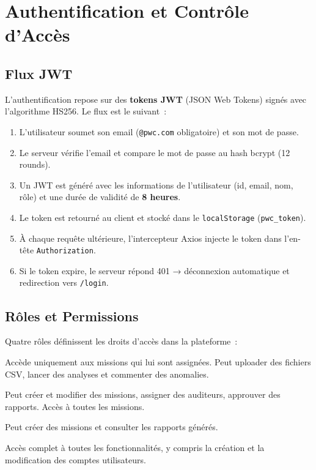 \section{Authentification et Contrôle d'Accès}

\subsection{Flux JWT}

L'authentification repose sur des \textbf{tokens JWT} (JSON Web Tokens) signés avec l'algorithme HS256. Le flux est le suivant~:

\begin{enumerate}[leftmargin=1.5em]
  \item L'utilisateur soumet son email (\texttt{@pwc.com} obligatoire) et son mot de passe.
  \item Le serveur vérifie l'email et compare le mot de passe au hash bcrypt (12 rounds).
  \item Un JWT est généré avec les informations de l'utilisateur (id, email, nom, rôle) et une durée de validité de \textbf{8 heures}.
  \item Le token est retourné au client et stocké dans le \texttt{localStorage} (\texttt{pwc\_token}).
  \item À chaque requête ultérieure, l'intercepteur Axios injecte le token dans l'en-tête \texttt{Authorization}.
  \item Si le token expire, le serveur répond 401 → déconnexion automatique et redirection vers \texttt{/login}.
\end{enumerate}

\subsection{Rôles et Permissions}

Quatre rôles définissent les droits d'accès dans la plateforme~:

\begin{description}[leftmargin=1.5em, style=nextline]
  \item[Auditeur] Accède uniquement aux missions qui lui sont assignées. Peut uploader des fichiers CSV, lancer des analyses et commenter des anomalies.
  \item[Manager] Peut créer et modifier des missions, assigner des auditeurs, approuver des rapports. Accès à toutes les missions.
  \item[Partenaire] Peut créer des missions et consulter les rapports générés.
  \item[Administrateur] Accès complet à toutes les fonctionnalités, y compris la création et la modification des comptes utilisateurs.
\end{description}

